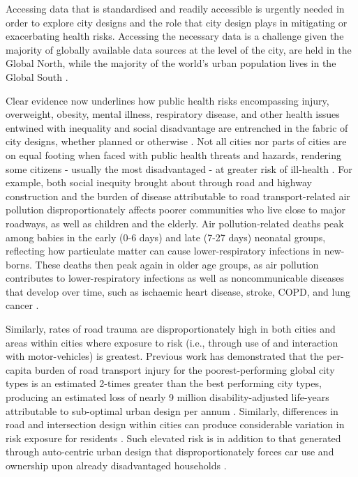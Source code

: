 \documentclass[preprint,12pt]{elsarticle}
\begin{document}
Accessing data that is standardised and readily accessible is urgently needed in order to explore city designs and the role that city design plays in mitigating or exacerbating health risks. Accessing the necessary data is a challenge given the majority of globally available data sources at the level of the city, are held in the Global North, while the majority of the world's urban population lives in the Global South \cite{Smit2021}.

Clear evidence now underlines how public health risks encompassing injury, overweight, obesity, mental illness, respiratory disease, and other health issues entwined with inequality and social disadvantage are entrenched in the fabric of city designs, whether planned or otherwise \cite{borrell2013factors,xing2016impact,yuchi2020road}. Not all cities nor parts of cities are on equal footing when faced with public health threats and hazards, rendering some citizens - usually the most disadvantaged - at greater risk of ill-health \cite{KRISHNA2021102046}. For example, both social inequity brought about through road and highway construction \cite{carpenter2010poverty,archer2020white} and the burden of disease attributable to road transport-related air pollution disproportionately affects poorer communities who live close to major roadways, as well as children and the elderly. Air pollution-related deaths peak among babies in the early (0-6 days) and late (7-27 days) neonatal groups, reflecting how particulate matter can cause lower-respiratory infections in new-borns. These deaths then peak again in older age groups, as air pollution contributes to lower-respiratory infections as well as noncommunicable diseases that develop over time, such as ischaemic heart disease, stroke, COPD, and lung cancer \cite{boogaard2022long}. 

Similarly, rates of road trauma are disproportionately high in both cities and areas within cities where exposure to risk (i.e., through use of and interaction with motor-vehicles) is greatest. Previous work has demonstrated that the per-capita burden of road transport injury for the poorest-performing global city types is an estimated 2-times greater than the best performing city types, producing an estimated loss of nearly 9 million disability-adjusted life-years attributable to sub-optimal urban design per annum \cite{Thompson2020}. Similarly, differences in road and intersection design within cities can produce considerable variation in risk exposure for residents \cite{Wijnands_IntersectionDesign2021,MORRISON2019123}. Such elevated risk is in addition to that generated through auto-centric urban design that disproportionately forces car use and ownership upon already disadvantaged households \cite{currie2018alarming, CURL201861}. 
\end{document}
